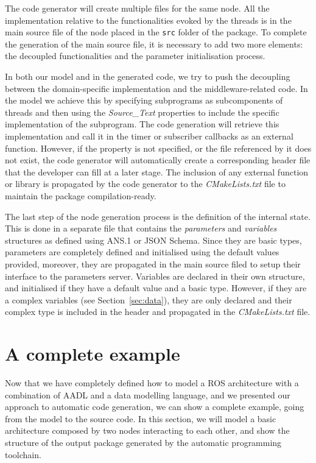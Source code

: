 The code generator will create multiple files for the same node. All the implementation relative to the functionalities evoked by the threads is in the main source file of the node placed in the \texttt{src} folder of the package. To complete the generation of the main source file, it is necessary to add two more elements: the decoupled functionalities and the parameter initialisation process.

In both our model and in the generated code, we try to push the decoupling between the domain-specific implementation and the middleware-related code. In the model we achieve this by specifying subprograms as subcomponents of threads and then using the \textit{Source\_Text} properties to include the specific implementation of the subprogram. The code generation will retrieve this implementation and call it in the timer or subscriber callbacks as an external function. However, if the property is not specified, or the file referenced by it does not exist, the code generator will automatically create a corresponding header file that the developer can fill at a later stage. The inclusion of any external function or library is propagated by the code generator to the \textit{CMakeLists.txt} file to maintain the package compilation-ready.

The last step of the node generation process is the definition of the internal state. This is done in a separate file that contains the \textit{parameters} and \textit{variables} structures as defined using ANS.1 or JSON Schema. Since they are basic types, parameters are completely defined and initialised using the default values provided, moreover, they are propagated in the main source filed to setup their interface to the parameters server. Variables are declared in their own structure, and initialised if they have a default value and a basic type. However, if they are a complex variables (see Section~\ref{sec:data}), they are only declared and their complex type is included in the header and propagated in the \textit{CMakeLists.txt} file.

\section{A complete example}
Now that we have completely defined how to model a ROS architecture with a combination of AADL and a data modelling language, and we presented our approach to automatic code generation, we can show a complete example, going from the model to the source code. In this section, we will model a basic architecture composed by two nodes interacting to each other, and show the structure of the output package generated by the automatic programming toolchain.

